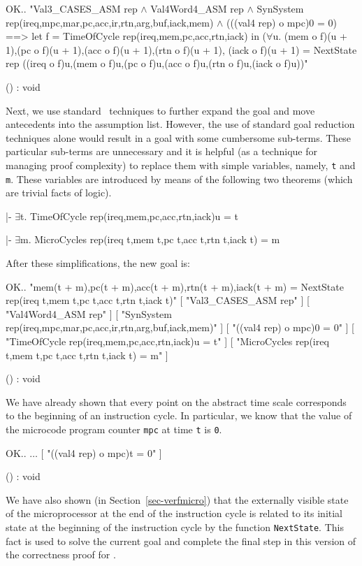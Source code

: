 \begintt
OK..
"Val3_CASES_ASM rep \(\wedge\)
 Val4Word4_ASM rep \(\wedge\)
 SynSystem rep(ireq,mpc,mar,pc,acc,ir,rtn,arg,buf,iack,mem) \(\wedge\)
 (((val4 rep) o mpc)0 = 0) ==>
 let f = TimeOfCycle rep(ireq,mem,pc,acc,rtn,iack)
 in
  (\(\forall\)u.
    (mem o f)(u + 1),(pc o f)(u + 1),(acc o f)(u + 1),(rtn o f)(u + 1),
    (iack o f)(u + 1) =
    NextState 
    rep
    ((ireq o f)u,(mem o f)u,(pc o f)u,(acc o f)u,(rtn o f)u,(iack o f)u))"

() : void
\endtt

Next, we use
standard \HOL\ techniques to
further expand the goal and move antecedents
into the assumption list.
However, the use of standard goal reduction techniques alone would
result in a goal with some cumbersome sub-terms.
These particular sub-terms are unnecessary and
it is helpful (as a technique for managing proof complexity) to replace
them with simple variables, namely,
\verb"t" and \verb"m".
These variables are introduced by means of the following two theorems
(which are trivial facts of logic).

\begintt
|- \(\exists\)t. TimeOfCycle rep(ireq,mem,pc,acc,rtn,iack)u = t

|- \(\exists\)m. MicroCycles rep(ireq t,mem t,pc t,acc t,rtn t,iack t) = m
\endtt

After these simplifications, the new goal is:

\begintt
OK..
"mem(t + m),pc(t + m),acc(t + m),rtn(t + m),iack(t + m) =
 NextState rep(ireq t,mem t,pc t,acc t,rtn t,iack t)"
    [ "Val3_CASES_ASM rep" ]
    [ "Val4Word4_ASM rep" ]
    [ "SynSystem rep(ireq,mpc,mar,pc,acc,ir,rtn,arg,buf,iack,mem)" ]
    [ "((val4 rep) o mpc)0 = 0" ]
    [ "TimeOfCycle rep(ireq,mem,pc,acc,rtn,iack)u = t" ]
    [ "MicroCycles rep(ireq t,mem t,pc t,acc t,rtn t,iack t) = m" ]

() : void
\endtt

We have already shown that every point on the abstract time scale
corresponds to the beginning of an instruction cycle.
In particular, we know that the
value of the microcode program counter \verb"mpc"
at time \verb"t" is \verb"0".

\begintt
OK..
\(\ldots\)
    [ "((val4 rep) o mpc)t = 0" ]

() : void
\endtt

We have also shown (in Section~\ref{sec-verfmicro})
that the externally visible state
of the microprocessor at the end of the instruction cycle is
related to its initial state at the beginning of the instruction cycle
by the function \verb"NextState".
This fact
is used to solve the current goal
and complete the final step in this version of the correctness proof
for \Tamarack.

